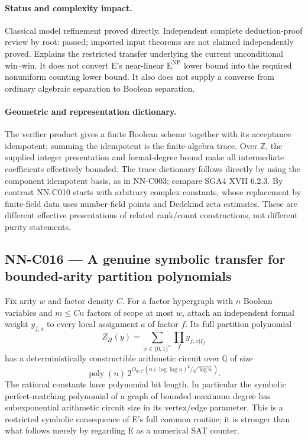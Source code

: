 \paragraph{Status and complexity impact.}
Classical model refinement proved directly. Independent complete deduction-proof review by root: passed; imported input theorems are not claimed independently proved. Explains the restricted transfer underlying the current unconditional win--win. It does not convert E's near-linear $\mathrm E^{\mathrm{NP}}$ lower bound into the required nonuniform counting lower bound. It also does not supply a converse from ordinary algebraic separation to Boolean separation.

\paragraph{Geometric and representation dictionary.}
The verifier product gives a finite Boolean scheme together with its acceptance idempotent; summing the idempotent is the finite-algebra trace. Over $\mathbb Z$, the supplied integer presentation and formal-degree bound make all intermediate coefficients effectively bounded. The trace dictionary follows directly by using the component idempotent basis, as in NN-C003; compare SGA4 XVII 6.2.3. By contrast NN-C010 starts with arbitrary complex constants, whose replacement by finite-field data uses number-field points and Dedekind zeta estimates. These are different effective presentations of related rank/count constructions, not different purity statements.

\subsection{NN-C016 --- A genuine symbolic transfer for bounded-arity partition polynomials}
\begin{proposition}[NN-C016]
Fix arity $w$ and factor density $C$. For a factor hypergraph with $n$ Boolean variables and $m\leq Cn$ factors of scope at most $w$, attach an independent formal weight $y_{f,a}$ to every local assignment $a$ of factor $f$. Its full partition polynomial
\[
 Z_H(y)=\sum_{x\in\{0,1\}^n}\prod_f y_{f,x|I_f}
\]
has a deterministically constructible arithmetic circuit over $\mathbb Q$ of size
\[
 \operatorname{poly}(n)\,2^{O_{w,C}(n(\log\log n)^2/\sqrt{\log n})}.
\]
The rational constants have polynomial bit length. In particular the symbolic perfect-matching polynomial of a graph of bounded maximum degree has subexponential arithmetic circuit size in its vertex/edge parameter. This is a restricted symbolic consequence of E's full common routine; it is stronger than what follows merely by regarding E as a numerical SAT counter.
\end{proposition}
